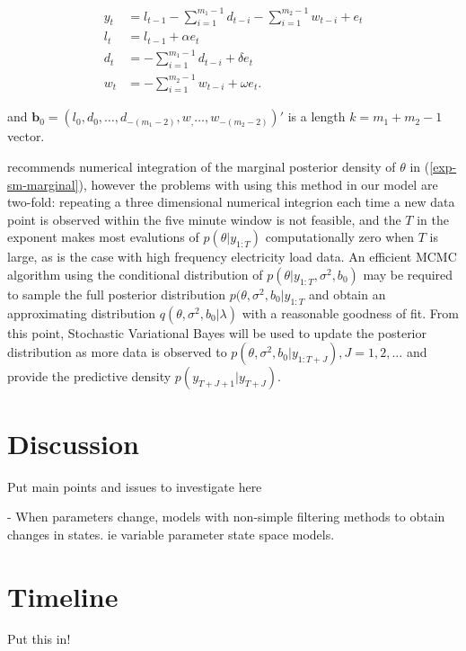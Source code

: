 \documentclass[12pt,a4paper]{article}%
\numberwithin{equation}{section}
\begin{document}
\begin{align}
y_t &= l_{t-1} - \sum_{i = 1}^{m_1 - 1}d_{t-i} - \sum_{i = 1}^{m_2 - 1}w_{t-i} + e_t \label{ds-hw-rp1} \\
l_t &= l_{t-1} + \alpha e_t \label{ds-hw-rp2} \\
d_t &= - \sum_{i = 1}^{m_1 - 1}d_{t-i} + \delta e_t \label{ds-hw-rp3} \\
w_t &= - \sum_{i = 1}^{m_2 - 1}w_{t-i} + \omega e_t \label{ds-hw-rp4}.
\end{align}

and $\boldsymbol{b}_0 = (l_0, d_0, \dots, d_{-(m_1 - 2)}, w_, \dots, w_{-(m_2 - 2)})'$ is a length $k = m_1 + m_2 - 1$ vector.

\citet{Forbes2000} recommends numerical integration of the marginal posterior density of $\theta$ in (\ref{exp-sm-marginal}), however the problems with using this method in our model are two-fold: repeating a three dimensional numerical integrion each time a new data point is observed within the five minute window is not feasible, and the $T$ in the exponent makes most evalutions of $p(\theta | y_{1:T})$ computationally zero when $T$ is large, as is the case with high frequency electricity load data. An efficient MCMC algorithm using the conditional distribution of $p(\theta | y_{1:T}, \sigma^2, b_0)$ may be required to sample the full posterior distribution $p(\theta, \sigma^2, b_0 | y_{1:T}$ and obtain an approximating distribution $q(\theta, \sigma^2, b_0 | \lambda)$ with a reasonable goodness of fit. From this point, Stochastic Variational Bayes will be used to update the posterior distribution as more data is observed to $p(\theta, \sigma^2, b_0 | y_{1:T+J}), J = 1, 2, \dots$ and provide the predictive density $p(y_{T+J+1} | y_{T+J})$.

\section{Discussion} \label{sec:Discussion}

Put main points and issues to investigate here

- When parameters change, models with non-simple filtering methods to obtain changes in states. ie variable parameter state space models.

\section{Timeline} \label{sec:Timeline}


Put this in!



\end{document}
